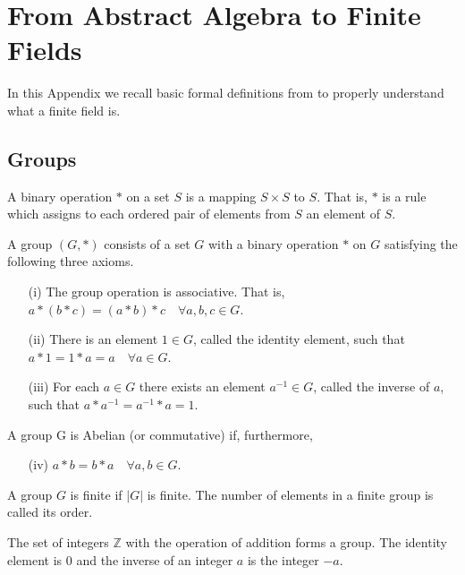 \chapter{From Abstract Algebra to Finite Fields}
\label{app:A}

In this Appendix we recall basic formal definitions from \cite{Menezes97handbookof} to properly understand what a finite field is.

\section{Groups}
\begin{mydef} A binary operation $*$ on a set $S$ is a mapping  $S \times S$ to $S$. That is, $*$ is a rule which assigns to each ordered pair of elements from $S$ an element of $S$. \end{mydef}

\begin{mydef} 
	A group $(G, *)$ consists of a set $G$ with a binary operation $*$ on $G$ satisfying
	the following three axioms.
	\begin{itemize}
		\item[(i)] The group operation is associative. That is, $a* (b * c) = (a* b) * c \quad \forall a, b, c \in G$.
		\item[(ii)] There is an element $1 \in G$, called the identity element, such that $a * 1 = 1 * a = a \quad \forall a \in G$.
		\item[(iii)] For each $a \in G $ there exists an element $a^{-1} \in G$, called the inverse of $a$, such that $a *a^{-1}= a^{-1} * a = 1$.
	\end{itemize}
	A group G is Abelian (or commutative) if, furthermore,
	\begin{itemize}
		\item[(iv)] $a * b = b * a \quad \forall a, b \in G$. 
	\end{itemize}
\end{mydef}

\begin{mydef} 
	A group $G$ is finite if $|G|$ is finite. The number of elements in a finite group is called its order.
\end{mydef}

\begin{myexample} 
	The set of integers $\mathbb{Z}$ with the operation of addition forms a group. 
	The identity element is 0 and the inverse of an integer $a$ is the integer $-a$. 
\end{myexample}

